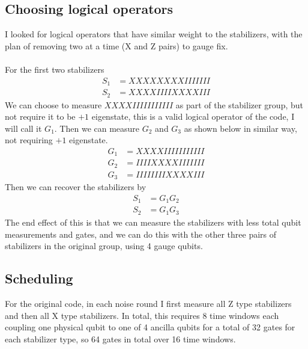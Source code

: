 \documentclass{article}
\begin{document}
\subsection{Choosing logical operators}
I looked for logical operators that have similar weight to the stabilizers, with the plan of removing two at a time (X and Z pairs) to gauge fix.
\\\\
For the first two stabilizers
\begin{align*}
    S_1 &= XXXXXXXXIIIIIII \\
    S_2 &= XXXXIIIIXXXXIII
\end{align*}
We can choose to measure $XXXXIIIIIIIIIII$ as part of the stabilizer group, but not require it to be $+1$ eigenstate, this is a valid logical operator of the code, I will call it $G_1$. Then we can measure $G_2$ and $G_3$ as shown below in similar way, not requiring $+1$ eigenstate.
\begin{align*}
    G_1 &= XXXXIIIIIIIIIII \\
    G_2 &= IIIIXXXXIIIIIII \\
    G_3 &= IIIIIIIIXXXXIII
\end{align*}
Then we can recover the stabilizers by
\begin{align*}
    S_1 &= G_1G_2 \\
    S_2 &= G_1G_3
\end{align*}
The end effect of this is that we can measure the stabilizers with less total qubit measurements and gates, and we can do this with the other three pairs of stabilizers in the original group, using 4 gauge qubits.

\subsection{Scheduling}
For the original code, in each noise round I first measure all Z type stabilizers and then all X type stabilizers. In total, this requires 8 time windows each coupling one physical qubit to one of 4 ancilla qubits for a total of 32 gates for each stabilizer type, so 64 gates in total over 16 time windows.
\end{document}
